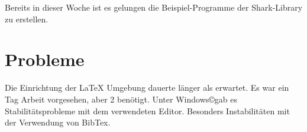 ﻿\documentclass[a4paper,12pt,fleqn]{scrartcl}
\begin{document}
Bereits in dieser Woche ist es gelungen die Beispiel-Programme der Shark-Library zu erstellen.

\section[Probleme]{Probleme}
Die Einrichtung der \LaTeX{} Umgebung dauerte länger als erwartet. Es war ein Tag Arbeit
vorgesehen, aber 2 benötigt. \newline
Unter Windows\copyright gab es Stabilitätsprobleme mit dem verwendeten Editor. Besonders Instabilitäten mit der Verwendung von BibTex.


\end{document}
